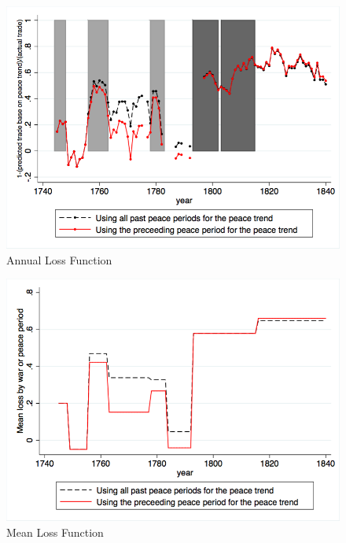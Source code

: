 \documentclass[12pt,a4paper,notitlepage,english]{article}
\begin{document}
\begin{center}
\begin{figure}[H]
\caption{Annual Loss Function}
\label{annual_loss_function}
\includegraphics[scale=.3]{Annual_loss_function.png}
\end{figure}
\end{center}

\begin{center}
\begin{figure}[H]
\caption{Mean Loss Function}
\label{mean_loss_function}
\includegraphics[scale=.3]{Mean_loss_function.png}
\end{figure}
\end{center}
\end{document}
